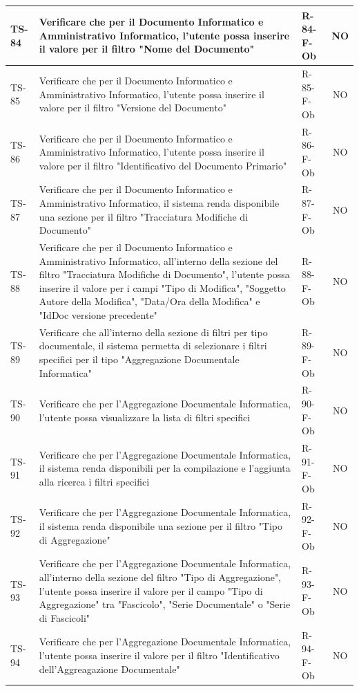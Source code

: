 \documentclass[a4paper,12pt]{article}
\begin{document}
\begin{longtable}{|p{1.5cm}|p{8.3cm}|p{2.4cm}|c|}
\hline
TS-84 & Verificare che per il Documento Informatico e Amministrativo Informatico, l'utente possa inserire il valore per il filtro "Nome del Documento" & R-84-F-Ob & NO \\
\hline
TS-85 & Verificare che per il Documento Informatico e Amministrativo Informatico, l'utente possa inserire il valore per il filtro "Versione del Documento" & R-85-F-Ob & NO \\
\hline
TS-86 & Verificare che per il Documento Informatico e Amministrativo Informatico, l'utente possa inserire il valore per il filtro "Identificativo del Documento Primario" & R-86-F-Ob & NO \\
\hline
TS-87 & Verificare che per il Documento Informatico e Amministrativo Informatico, il sistema renda disponibile una sezione per il filtro "Tracciatura Modifiche di Documento" & R-87-F-Ob & NO \\
\hline
TS-88 & Verificare che per il Documento Informatico e Amministrativo Informatico, all'interno della sezione del filtro "Tracciatura Modifiche di Documento", l'utente possa inserire il valore per i campi "Tipo di Modifica", "Soggetto Autore della Modifica", "Data/Ora della Modifica" e "IdDoc versione precedente" & R-88-F-Ob & NO \\
\hline
TS-89 & Verificare che all'interno della sezione di filtri per tipo documentale, il sistema permetta di selezionare i filtri specifici per il tipo "Aggregazione Documentale Informatica" & R-89-F-Ob & NO \\
\hline
TS-90 & Verificare che per l'Aggregazione Documentale Informatica, l'utente possa visualizzare la lista di filtri specifici & R-90-F-Ob & NO \\
\hline
TS-91 & Verificare che per l'Aggregazione Documentale Informatica, il sistema renda disponibili per la compilazione e l'aggiunta alla ricerca i filtri specifici & R-91-F-Ob  & NO \\
\hline
TS-92 & Verificare che per l'Aggregazione Documentale Informatica, il sistema renda disponibile una sezione per il filtro "Tipo di Aggregazione" & R-92-F-Ob & NO \\
\hline
TS-93 & Verificare che per l'Aggregazione Documentale Informatica, all'interno della sezione del filtro "Tipo di Aggregazione", l'utente possa inserire il valore per il campo "Tipo di Aggregazione" tra "Fascicolo", "Serie Documentale" o "Serie di Fascicoli" & R-93-F-Ob & NO \\
\hline
TS-94 & Verificare che per l'Aggregazione Documentale Informatica, l'utente possa inserire il valore per il filtro "Identificativo dell'Aggreagazione Documentale" & R-94-F-Ob & NO \\

\end{longtable}
\end{document}
